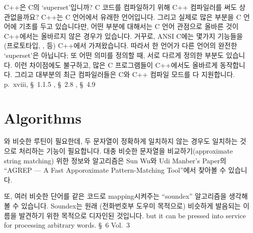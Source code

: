 \begin{faq}
	C++은 C의 `superset'입니까? C 코드를 컴파일하기 위해 C++ 컴파일러를
	써도 상관없을까요?
\A
	C++는 C 언어에서 유래한 언어입니다.  그리고 실제로 많은 부분을
	C 언어에 기초를 두고 있습니다만, 어떤 부분에 대해서는 C 언어 관점으로
	올바른 것이 C++에서는 올바르지 않은 경우가 있습니다.
	거꾸로, ANSI C에는 몇가지 기능들을 (프로토타입, ,
	등) C++에서 가져왔습니다.  따라서 한 언어가 다른 언어의 완전한
	`superset'은 아닙니다; 또 어떤 의미를 정의할 때, 서로 다르게 정의한
	부분도 있습니다.
	이런 차이점에도 불구하고, 많은 C 프로그램들이 C++에서도 올바르게
	동작합니다.  그리고 대부분의 최근 컴파일러들은 C와 C++ 컴파일 모드를
	다 지원합니다.  
\R
	\cite{hs} p.\ xviii, \S\ 1.1.5 , \S\ 2.8 , 
		\S\ 4.9 
\end{faq}

\section{Algorithms}	\label{sec:algorithm}

\begin{faq}
	와 비슷한 루틴이 필요한데, 두 문자열이 정확하게
	일치하지 않는 경우도 일치하는 것으로 처리하는 기능이 필요합니다.
\A
	대충 비슷한 문자열을 비교하기(approximate string matching) 위한
	정보와 알고리즘은
	Sun Wu와 Udi Manber's Paper의 ``AGREP --- A Fast Apporoximate
	Pattern-Matching Tool''에서 찾아볼 수 있습니다.


	또, 여러 비슷한 단어를 같은 코드로 mapping시켜주는
	``soundex'' 알고리즘을 생각해 볼 수 있습니다.
	Soundex는 원래 (전화번호부 도우미 목적으로) 비슷하게 발음되는
	이름을 발견하기 위한 목적으로 디자인된 것입니다.
	but it can be pressed into service
	for processing arbitrary words.
\R
	\cite{knuth} \S\ 6  Vol.\ 3 \\
	\cite{agrep}
\end{faq}

